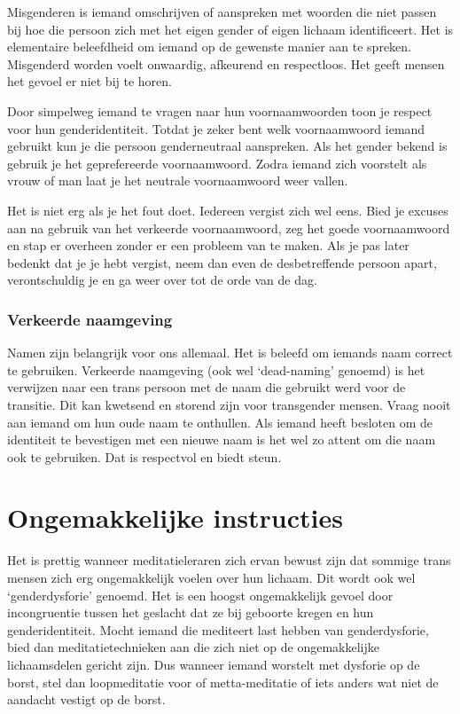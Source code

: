 \documentclass[12pt,openany]{book}
\begin{document}
Misgenderen is iemand omschrijven of aanspreken met woorden die niet passen bij hoe die persoon zich met het eigen gender of eigen lichaam identificeert. Het is elementaire beleefdheid om iemand op de gewenste manier aan te spreken. Misgenderd worden voelt onwaardig, afkeurend en respectloos. Het geeft mensen het gevoel er niet bij te horen. 

Door simpelweg iemand te vragen naar hun voornaamwoorden toon je respect voor hun genderidentiteit. Totdat je zeker bent welk voornaamwoord iemand gebruikt kun je die persoon genderneutraal aanspreken. Als het gender bekend is gebruik je het geprefereerde voornaamwoord. Zodra iemand zich voorstelt als vrouw of man laat je het neutrale voornaamwoord weer vallen.

Het is niet erg als je het fout doet. Iedereen vergist zich wel eens. Bied je excuses aan na gebruik van het verkeerde voornaamwoord, zeg het goede voornaamwoord en stap er overheen zonder er een probleem van te maken. Als je pas later bedenkt dat je je hebt vergist, neem dan even de desbetreffende persoon apart, verontschuldig je en ga weer over tot de orde van de dag.

\subsubsection*{Verkeerde naamgeving}

Namen zijn belangrijk voor ons allemaal. Het is beleefd om iemands naam correct te gebruiken. Verkeerde naamgeving (ook wel `dead-naming' genoemd) is het verwijzen naar een trans persoon met de naam die gebruikt werd voor de transitie. Dit kan kwetsend en storend zijn voor transgender mensen. Vraag nooit aan iemand om hun oude naam te onthullen. Als iemand heeft besloten om de identiteit te bevestigen met een nieuwe naam is het wel zo attent om die naam ook te gebruiken. Dat is respectvol en biedt steun. 

\section*{Ongemakkelijke instructies}

Het is prettig wanneer meditatieleraren zich ervan bewust zijn dat sommige trans mensen zich erg ongemakkelijk voelen over hun lichaam. Dit wordt ook wel `genderdysforie' genoemd. Het is een hoogst ongemakkelijk gevoel door incongruentie tussen het geslacht dat ze bij geboorte kregen en hun genderidentiteit. Mocht iemand die mediteert last hebben van genderdysforie, bied dan meditatietechnieken aan die zich niet op de ongemakkelijke lichaamsdelen gericht zijn. Dus wanneer iemand worstelt met dysforie op de borst, stel dan loopmeditatie voor of metta-meditatie of iets anders wat niet de aandacht vestigt op de borst.
\end{document}

